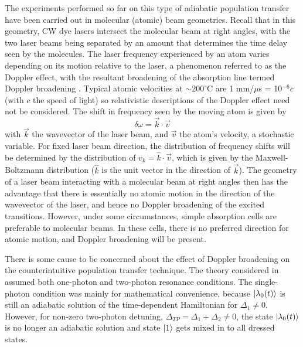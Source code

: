 \hspace{\parindent} The experiments performed so far on this type of adiabatic
population transfer have been carried out in molecular (atomic) beam
geometries.  Recall that in this geometry, CW dye lasers intersect the molecular
beam at right angles, with the two laser beams being separated by an amount that
determines the time delay seen by the molecules.  The laser frequency experienced
by an atom varies depending on its motion relative to the laser, a phenomenon
referred to as the Doppler effect, with the resultant broadening of the
absorption line termed Doppler broadening \cite{Loudon_book}.  Typical atomic
velocities at
$\sim 200^{\circ}$C are 1 mm/$\mu$s = 10$^{-6} c$ (with $c$ the speed of light)
so relativistic descriptions of the Doppler effect need not be
considered.  The shift in frequency seen by the moving atom is given by
\begin{equation}
\delta\omega = \vec{k} \cdot \vec{v}
\end{equation}
with $\vec{k}$ the wavevector of the laser beam, and $\vec{v}$
the atom's velocity, a stochastic variable.  For fixed laser beam
direction, the distribution of frequency shifts will be determined by the
distribution of $ v_k = \hat{k} \cdot \vec{v}$, which is given by the
Maxwell-Boltzmann distribution ($\hat{k}$ is the unit vector in
the direction of $\vec{k}$). The geometry of a laser beam interacting with a
molecular beam at right angles then has the advantage that there is essentially
no atomic motion in the direction of the wavevector of the laser,
and hence no Doppler broadening of the excited transitions.
However, under some circumstances, simple absorption cells are preferable to
molecular beams.  In these cells, there is no preferred direction for atomic
motion, and Doppler broadening will be present.

There is some cause to be concerned about the effect of Doppler broadening on
the counterintuitive population transfer technique.  The theory considered in
 assumed both one-photon and two-photon
resonance conditions.  The single-photon condition was mainly for mathematical
convenience, because $\vert \lambda_0(t) \rangle$ is still an adiabatic solution of the
time-dependent Hamiltonian for $\Delta_1 \neq 0$.  However, for
non-zero two-photon detuning, $\Delta_{TP} = \Delta_1 + \Delta_2 \neq 0$, the
state $\vert \lambda_0(t) \rangle$ is no longer an adiabatic solution and state
$\vert 1 \rangle$ gets mixed in to all dressed states.

